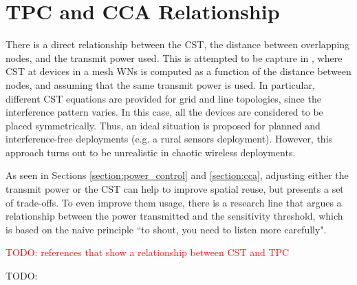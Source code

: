\documentclass[12pt, a4paper,twoside]{tesi_upf}
\begin{document}
		\section{TPC and CCA Relationship}
		\label{section:tpc_cst_relationship}
		
		
			There is a direct relationship between the CST, the distance between overlapping nodes, and the transmit power used. This is attempted to be capture in \cite{zhu2004leveraging}, where CST at devices in a mesh WNs is computed as a function of the distance between nodes, and assuming that the same transmit power is used. In particular, different CST equations are provided for grid and line topologies, since the interference pattern varies. In this case, all the devices are considered to be placed symmetrically. Thus, an ideal situation is proposed for planned and interference-free deployments (e.g. a rural sensors deployment). However, this approach turns out to be unrealistic in chaotic wireless deployments.
			
			
			As seen in Sections \ref{section:power_control} and \ref{section:cca}, adjusting either the transmit power or the CST can help to improve spatial reuse, but presents a set of trade-offs. To even improve them usage, there is a research line that argues a relationship between the power transmitted and the sensitivity threshold, which is based on the naive principle ``to shout, you need to listen more carefully".
			
			\textcolor{red}{TODO: references that show a relationship between CST and TPC}			
			
			\cite{oteri2015improved}
			
			TODO:  \cite{jamil2014improving} \cite{zhu2004leveraging}
			
\end{document}
